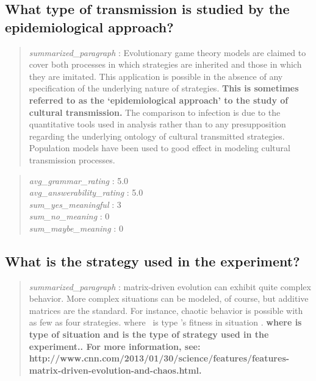 \hypertarget{what-type-of-transmission-is-studied-by-the-epidemiological-approach}{%
\subsection{What type of transmission is studied by the epidemiological
approach?}\label{what-type-of-transmission-is-studied-by-the-epidemiological-approach}}

\begin{quote}
\emph{summarized\_paragraph} : Evolutionary game theory models are
claimed to cover both processes in which strategies are inherited and
those in which they are imitated. This application is possible in the
absence of any specification of the underlying nature of strategies.
\textbf{This is sometimes referred to as the `epidemiological approach'
to the study of cultural transmission.} The comparison to infection is
due to the quantitative tools used in analysis rather than to any
presupposition regarding the underlying ontology of cultural transmitted
strategies. Population models have been used to good effect in modeling
cultural transmission processes.
\end{quote}

\begin{quote}
\emph{avg\_grammar\_rating} : 5.0\\
\emph{avg\_answerability\_rating} : 5.0\\
\emph{sum\_yes\_meaningful} : 3\\
\emph{sum\_no\_meaning} : 0\\
\emph{sum\_maybe\_meaning} : 0
\end{quote}

\hypertarget{what-is-the-strategy-used-in-the-experiment}{%
\subsection{What is the strategy used in the
experiment?}\label{what-is-the-strategy-used-in-the-experiment}}

\begin{quote}
\emph{summarized\_paragraph} : matrix-driven evolution can exhibit quite
complex behavior. More complex situations can be modeled, of course, but
additive matrices are the standard. For instance, chaotic behavior is
possible with as few as four strategies. where ~is type 's fitness in
situation . \textbf{where is type of situation and is the type of
strategy used in the experiment.. For more information, see:
http://www.cnn.com/2013/01/30/science/features/features-matrix-driven-evolution-and-chaos.html.}
\end{quote}

